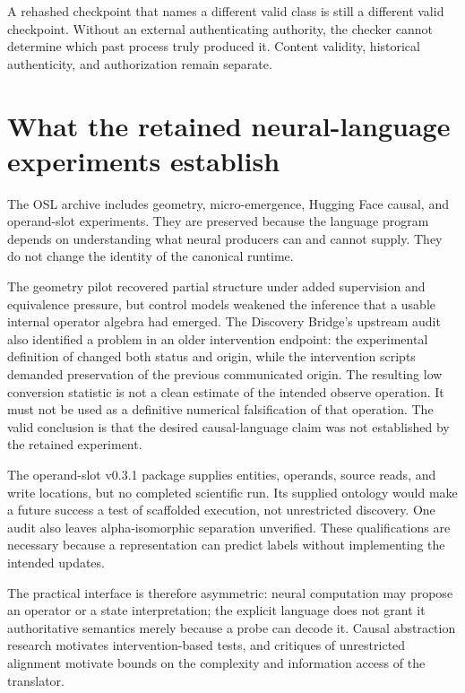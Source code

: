 \documentclass[11pt]{article}
\begin{document}
A rehashed checkpoint that names a different valid class is still a different valid checkpoint. Without an external authenticating authority, the checker cannot determine which past process truly produced it. Content validity, historical authenticity, and authorization remain separate.

\section{What the retained neural-language experiments establish}
The OSL archive includes geometry, micro-emergence, Hugging Face causal, and operand-slot experiments. They are preserved because the language program depends on understanding what neural producers can and cannot supply. They do not change the identity of the canonical runtime. \cite{olineage}

The geometry pilot recovered partial structure under added supervision and equivalence pressure, but control models weakened the inference that a usable internal operator algebra had emerged. The Discovery Bridge's upstream audit also identified a problem in an older intervention endpoint: the experimental definition of  changed both status and origin, while the intervention scripts demanded preservation of the previous communicated origin. The resulting low conversion statistic is not a clean estimate of the intended observe operation. It must not be used as a definitive numerical falsification of that operation. The valid conclusion is that the desired causal-language claim was not established by the retained experiment. \cite{odb}

The operand-slot v0.3.1 package supplies entities, operands, source reads, and write locations, but no completed scientific run. Its supplied ontology would make a future success a test of scaffolded execution, not unrestricted discovery. One audit also leaves alpha-isomorphic separation unverified. These qualifications are necessary because a representation can predict labels without implementing the intended updates.

The practical interface is therefore asymmetric: neural computation may propose an operator or a state interpretation; the explicit language does not grant it authoritative semantics merely because a probe can decode it. Causal abstraction research motivates intervention-based tests, and critiques of unrestricted alignment motivate bounds on the complexity and information access of the translator. \cite{causal,dilemma}
\end{document}
